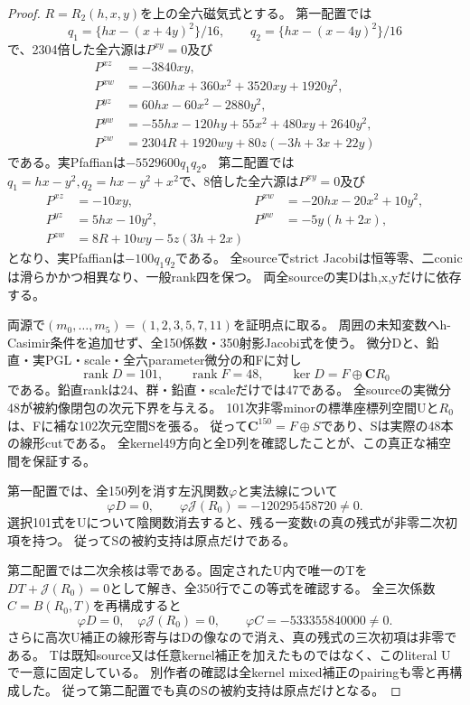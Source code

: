 \documentclass[a4paper,11pt]{ltjsarticle}
\theoremstyle{definition}
\newcommand{\CC}{\mathbf C}
\newcommand{\rank}{\operatorname{rank}}
\begin{document}
\begin{proof}
$R=R_2(h,x,y)$を上の全六磁気式とする。
第一配置では
\[
 q_1=\{hx-(x+4y)^2\}/16,\qquad q_2=\{hx-(x-4y)^2\}/16
\]
で、2304倍した全六源は$P^{xy}=0$及び
\[
\begin{aligned}
 P^{xz}&=-3840xy,\\
 P^{xw}&=-360hx+360x^2+3520xy+1920y^2,\\
 P^{yz}&=60hx-60x^2-2880y^2,\\
 P^{yw}&=-55hx-120hy+55x^2+480xy+2640y^2,\\
 P^{zw}&=2304R+1920wy+80z(-3h+3x+22y)
\end{aligned}
\]
である。実Pfaffianは$-5529600q_1q_2$。
第二配置では$q_1=hx-y^2,q_2=hx-y^2+x^2$で、8倍した全六源は$P^{xy}=0$及び
\[
\begin{aligned}
 P^{xz}&=-10xy,&P^{xw}&=-20hx-20x^2+10y^2,\\
 P^{yz}&=5hx-10y^2,&P^{yw}&=-5y(h+2x),\\
 P^{zw}&=8R+10wy-5z(3h+2x)
\end{aligned}
\]
となり、実Pfaffianは$-100q_1q_2$である。
全sourceでstrict Jacobiは恒等零、二conicは滑らかかつ相異なり、一般rank四を保つ。
両全sourceの実Dはh,x,yだけに依存する。

両源で$(m_0,\ldots,m_5)=(1,2,3,5,7,11)$を証明点に取る。
周囲の未知変数へh-Casimir条件を追加せず、全150係数・350射影Jacobi式を使う。
微分Dと、鉛直・実PGL・scale・全六parameter微分の和Fに対し
\[
 \rank D=101,\qquad\rank F=48,\qquad\ker D=F\oplus\CC R_0
\]
である。鉛直rankは24、群・鉛直・scaleだけでは47である。
全sourceの実微分48が被約像閉包の次元下界を与える。
101次非零minorの標準座標列空間Uと$R_0$は、Fに補な102次元空間Sを張る。
従って$\CC^{150}=F\oplus S$であり、Sは実際の48本の線形cutである。
全kernel49方向と全D列を確認したことが、この真正な補空間を保証する。

第一配置では、全150列を消す左汎関数$\varphi$と実法線について
\[
 \varphi D=0,\qquad \varphi\mathcal J(R_0)=-120295458720\ne0.
\]
選択101式をUについて陰関数消去すると、残る一変数tの真の残式が非零二次初項を持つ。
従ってSの被約支持は原点だけである。

第二配置では二次余核は零である。固定されたU内で唯一のTを
$DT+\mathcal J(R_0)=0$として解き、全350行でこの等式を確認する。
全三次係数$C=B(R_0,T)$を再構成すると
\[
 \varphi D=0,\quad\varphi\mathcal J(R_0)=0,\qquad
 \varphi C=-533355840000\ne0.
\]
さらに高次U補正の線形寄与はDの像なので消え、真の残式の三次初項は非零である。
Tは既知source又は任意kernel補正を加えたものではなく、このliteral Uで一意に固定している。
別作者の確認は全kernel mixed補正のpairingも零と再構成した。
従って第二配置でも真のSの被約支持は原点だけとなる。


\end{proof}
\end{document}
